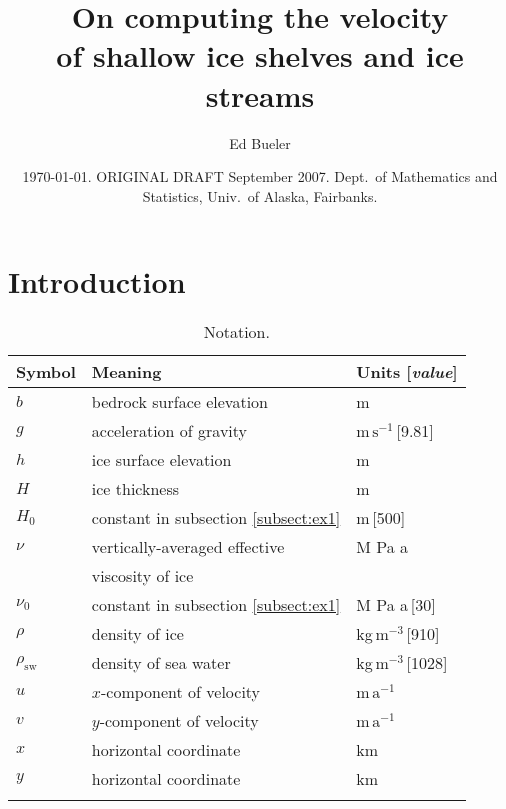 \documentclass[12pt]{amsart}%
\newcommand{\normalspacing}{\renewcommand{\baselinestretch}{1.1}\tiny\normalsize}
\newcommand{\tablespacing}{\renewcommand{\baselinestretch}{1.0}\tiny\normalsize}
\theoremstyle{plain}
\theoremstyle{definition}
\begin{document}
\title[Computing velocity for ice shelves and streams]{On computing the velocity \\ of shallow ice shelves and ice streams}

\author{Ed Bueler}

\date{\today.  ORIGINAL DRAFT September 2007.  Dept.~of Mathematics and Statistics, Univ.~of Alaska, Fairbanks.}

\maketitle
\thispagestyle{empty}

\section{Introduction}


\begin{table}[h] \small
\caption{Notation.}\label{tab:notation}
\begin{tabular}{lll}\hline
\textbf{Symbol} & \textbf{Meaning} & \textbf{Units [\emph{value}]}\\ \hline
$b$ & bedrock surface elevation & m \\
$g$ & acceleration of gravity & m\,$\text{s}^{-1}$\,[9.81] \\
$h$ & ice surface elevation & m \\
$H$ & ice thickness & m \\
$H_0$ & constant in subsection \ref{subsect:ex1} & m\,[500] \\
$\nu$ & vertically-averaged effective & M Pa a \\
 & \quad viscosity of ice &  \\
$\nu_0$ & constant in subsection \ref{subsect:ex1} & M Pa a\,[30] \\
$\rho$ & density of ice & kg\,$\text{m}^{-3}$\,[910] \\
$\rho_{\text{sw}}$ & density of sea water & kg\,$\text{m}^{-3}$\,[1028] \\
$u$ & $x$-component of velocity & m\,$\text{a}^{-1}$ \\
$v$ & $y$-component of velocity & m\,$\text{a}^{-1}$ \\
$x$ & horizontal coordinate & km \\
$y$ & horizontal coordinate & km \\
\hline
\normalsize \end{tabular}
\end{table}
\end{document}
